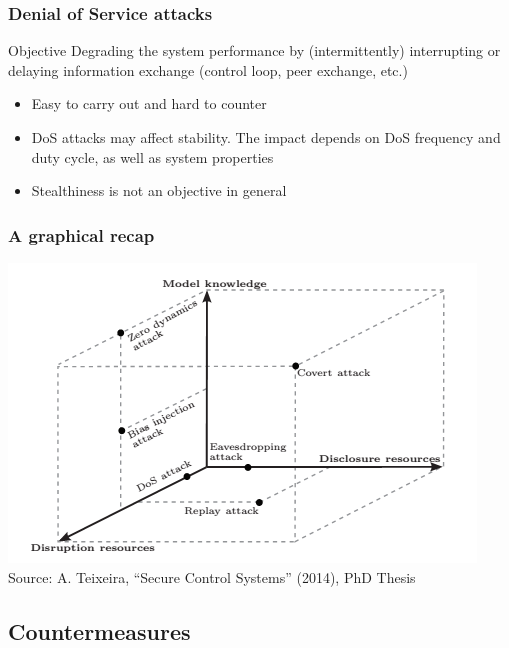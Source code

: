 \documentclass[presentation]{beamer}
\begin{document}
\begin{frame}
	\frametitle{Denial of Service attacks}

	\begin{block}{Objective}
		\centering
		Degrading the system performance by (intermittently) interrupting or delaying information exchange (control loop, peer exchange, etc.)
	\end{block}

	\vfill
	\begin{itemize}
		\item Easy to carry out and hard to counter

		\item DoS attacks may affect stability. 
		The impact depends on DoS frequency and duty cycle, as well as system properties

		\item Stealthiness is not an objective in general
	\end{itemize}
\end{frame}

\begin{frame}
	\frametitle{A graphical recap}

	\centering
	\includegraphics[scale=.4]{fig/attspace.png}\\
	{\scriptsize Source: A. Teixeira, ``Secure Control Systems'' (2014), PhD Thesis}
\end{frame}

\subsection{Countermeasures}
\end{document}
